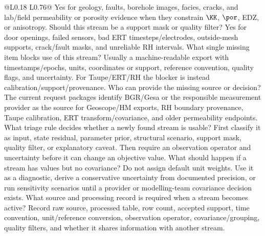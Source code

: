 \begin{longtable}{@{}L{0.18\textwidth} L{0.76\textwidth}@{}}
{Yes for geology, faults, borehole images, facies, cracks, and lab/field
permeability or porosity evidence when they constrain \(\KK\), \(\por\), EDZ, or
anisotropy.}
{ Should this stream be a support mask or quality filter?}
{Yes for door openings, failed sensors, bad ERT timesteps/electrodes, outside-mesh
supports, crack/fault masks, and unreliable RH intervals.}
{ What single missing item blocks use of this stream?}
{Usually a machine-readable export with timestamps/epochs, units, coordinates or
support, reference convention, quality flags, and uncertainty.  For Taupe/ERT/RH the
blocker is instead calibration/support/provenance.}
{ Who can provide the missing source or decision?}
{The current request packages identify BGR/Gesa or the responsible measurement
provider as the source for Geoscope/HM exports, RH boundary provenance, Taupe
calibration, ERT transform/covariance, and older permeability endpoints.}
{ What triage rule decides whether a newly found stream is usable?}
{First classify it as input, state residual, parameter prior, structural scenario,
support mask, quality filter, or explanatory caveat.  Then require an observation
operator and uncertainty before it can change an objective value.}
{ What should happen if a stream has values but no covariance?}
{Do not assign default unit weights.  Use it as a diagnostic, derive a conservative
uncertainty from documented precision, or run sensitivity scenarios until a provider
or modelling-team covariance decision exists.}
{ What source and processing record is required when a stream becomes active?}
{Record raw source, processed table, row count, accepted support, time convention,
unit/reference conversion, observation operator, covariance/grouping, quality filters,
and whether it shares information with another stream.}
\bottomrule
\end{longtable}
\endgroup
